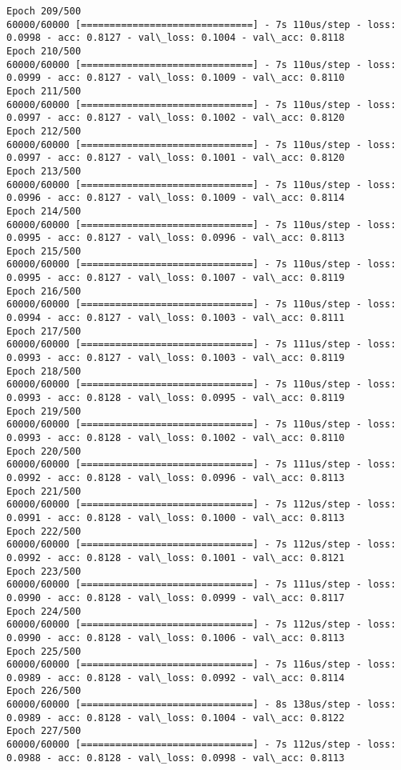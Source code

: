 \documentclass[11pt]{article}
\begin{document}
\begin{Verbatim}[commandchars=\\\{\}]
Epoch 209/500
60000/60000 [==============================] - 7s 110us/step - loss: 0.0998 - acc: 0.8127 - val\_loss: 0.1004 - val\_acc: 0.8118
Epoch 210/500
60000/60000 [==============================] - 7s 110us/step - loss: 0.0999 - acc: 0.8127 - val\_loss: 0.1009 - val\_acc: 0.8110
Epoch 211/500
60000/60000 [==============================] - 7s 110us/step - loss: 0.0997 - acc: 0.8127 - val\_loss: 0.1002 - val\_acc: 0.8120
Epoch 212/500
60000/60000 [==============================] - 7s 110us/step - loss: 0.0997 - acc: 0.8127 - val\_loss: 0.1001 - val\_acc: 0.8120
Epoch 213/500
60000/60000 [==============================] - 7s 110us/step - loss: 0.0996 - acc: 0.8127 - val\_loss: 0.1009 - val\_acc: 0.8114
Epoch 214/500
60000/60000 [==============================] - 7s 110us/step - loss: 0.0995 - acc: 0.8127 - val\_loss: 0.0996 - val\_acc: 0.8113
Epoch 215/500
60000/60000 [==============================] - 7s 110us/step - loss: 0.0995 - acc: 0.8127 - val\_loss: 0.1007 - val\_acc: 0.8119
Epoch 216/500
60000/60000 [==============================] - 7s 110us/step - loss: 0.0994 - acc: 0.8127 - val\_loss: 0.1003 - val\_acc: 0.8111
Epoch 217/500
60000/60000 [==============================] - 7s 111us/step - loss: 0.0993 - acc: 0.8127 - val\_loss: 0.1003 - val\_acc: 0.8119
Epoch 218/500
60000/60000 [==============================] - 7s 110us/step - loss: 0.0993 - acc: 0.8128 - val\_loss: 0.0995 - val\_acc: 0.8119
Epoch 219/500
60000/60000 [==============================] - 7s 110us/step - loss: 0.0993 - acc: 0.8128 - val\_loss: 0.1002 - val\_acc: 0.8110
Epoch 220/500
60000/60000 [==============================] - 7s 111us/step - loss: 0.0992 - acc: 0.8128 - val\_loss: 0.0996 - val\_acc: 0.8113
Epoch 221/500
60000/60000 [==============================] - 7s 112us/step - loss: 0.0991 - acc: 0.8128 - val\_loss: 0.1000 - val\_acc: 0.8113
Epoch 222/500
60000/60000 [==============================] - 7s 112us/step - loss: 0.0992 - acc: 0.8128 - val\_loss: 0.1001 - val\_acc: 0.8121
Epoch 223/500
60000/60000 [==============================] - 7s 111us/step - loss: 0.0990 - acc: 0.8128 - val\_loss: 0.0999 - val\_acc: 0.8117
Epoch 224/500
60000/60000 [==============================] - 7s 112us/step - loss: 0.0990 - acc: 0.8128 - val\_loss: 0.1006 - val\_acc: 0.8113
Epoch 225/500
60000/60000 [==============================] - 7s 116us/step - loss: 0.0989 - acc: 0.8128 - val\_loss: 0.0992 - val\_acc: 0.8114
Epoch 226/500
60000/60000 [==============================] - 8s 138us/step - loss: 0.0989 - acc: 0.8128 - val\_loss: 0.1004 - val\_acc: 0.8122
Epoch 227/500
60000/60000 [==============================] - 7s 112us/step - loss: 0.0988 - acc: 0.8128 - val\_loss: 0.0998 - val\_acc: 0.8113

\end{Verbatim}
\end{document}

